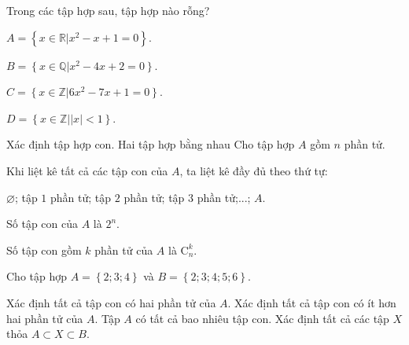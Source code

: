 \begin{vd}
	Trong các tập hợp sau, tập hợp nào rỗng?
	\begin{enumEX}{2}
		\item $A=\left\{\left. x\in \mathbb{R}\right|x^2-x+1=0\right\}$.
		\item $B=\left\{\left. x\in \mathbb{Q}\right|\right.x^2-4x+2\left. =0\right\}$.
		\item $C=\left\{\left. x\in \mathbb{Z}\right|\right.6x^2-7x+1\left. =0\right\}$.
		\item $D=\left\{\left. x\in \mathbb{Z}\right|\right.\left| x\right|<\left. 1\right\}$.
	\end{enumEX}
\end{vd}

\begin{dang}{Xác định tập hợp con. Hai tập hợp bằng nhau}
	Cho tập hợp $A$ gồm $n$ phần tử.
	\begin{listEX}[1]
		\item [\ding{172}] Khi liệt kê tất cả các tập con của $A$, ta liệt kê đầy đủ theo thứ tự:\\		
		\centerline{ $\varnothing$; tập $1$ phần tử; tập $2$ phần tử; tập $3$ phần tử;...; $A$.}
		\item [\ding{173}] Số tập con của $A$ là $2^n$.
		\item [\ding{174}] Số tập con gồm $k$ phần tử của $A$ là $\mathrm{C}_n^k$.
	\end{listEX}
\end{dang}
\begin{vd}
	Cho tập hợp $A=\left\{2;3;4\right\}$ và $B=\left\{2;3;4;5;6\right\}$.
	\begin{tasks}
		\task Xác định tất cả tập con có hai phần tử của $A$.
		\task Xác định tất cả tập con có ít hơn hai phần tử của $A$.
		\task Tập $A$ có tất cả bao nhiêu tập con.
		\task Xác định tất cả các tập $X$ thỏa $A \subset X \subset B$.
	\end{tasks}
\end{vd}

